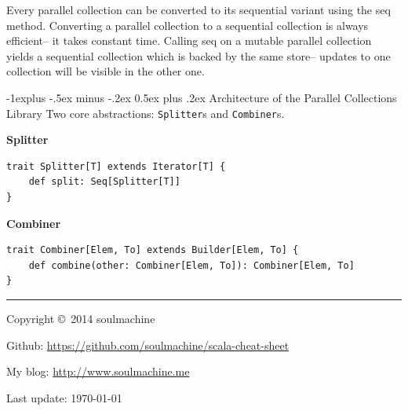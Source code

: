 \documentclass[a4paper,twoside,10pt,landscape]{article}
\makeatletter
\renewcommand{\subsection}{\@startsection{subsection}{2}{0mm}%
                                {-1explus -.5ex minus -.2ex}%
                                {0.5ex plus .2ex}%
                                {\normalfont\normalsize\bfseries}}
\makeatother
\begin{document}
\begin{multicols}{3}
Every parallel collection can be converted to its sequential variant using the seq method. Converting a parallel collection to a sequential collection is always efficient– it takes constant time. Calling seq on a mutable parallel collection yields a sequential collection which is backed by the same store– updates to one collection will be visible in the other one.


\subsection{Architecture of the Parallel Collections Library}
Two core abstractions: \texttt{Splitter}s and \texttt{Combiner}s.

\textbf{Splitter}
\begin{verbatim}
trait Splitter[T] extends Iterator[T] {
    def split: Seq[Splitter[T]]
}
\end{verbatim}

\textbf{Combiner}
\begin{verbatim}
trait Combiner[Elem, To] extends Builder[Elem, To] {
    def combine(other: Combiner[Elem, To]): Combiner[Elem, To]
}
\end{verbatim}



\rule{0.3\linewidth}{0.25pt}
\scriptsize

Copyright \copyright\ 2014 soulmachine

Github: \url{https://github.com/soulmachine/scala-cheat-sheet} 

My blog: \url{http://www.soulmachine.me}

Last update: \today


\end{multicols}
\end{document}
